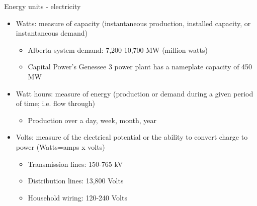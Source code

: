\documentclass{beamer}
\renewcommand{\(}{\begin{columns}}
\renewcommand{\)}{\end{columns}}
\newcommand{\<}[1]{\begin{column}{#1}}
\renewcommand{\>}{\end{column}}
\begin{document}
\begin{frame}{Energy units - electricity}
\begin{itemize}
\setlength\itemsep{.75em}
\item Watts: measure of capacity (instantaneous production, installed capacity, or instantaneous demand)
\begin{itemize}
\setlength\itemsep{.5em}
\item Alberta system demand: 7,200-10,700 MW (million watts)
\item Capital Power's Genessee 3 power plant has a nameplate capacity of 450 MW
\end{itemize}
\item Watt hours: measure of energy (production or demand during a given period of time; i.e. flow through)
\begin{itemize}
\setlength\itemsep{.5em}
\item Production over a day, week, month, year
\end{itemize}
\item Volts: measure of the electrical potential or the ability to convert charge to power (Watts=amps x volts)
\begin{itemize}
\setlength\itemsep{.5em}
\item Transmission lines: 150-765 kV
\item Distribution lines: 13,800 Volts
\item Household wiring: 120-240 Volts
\end{itemize}
\end{itemize}
\vfill \end{frame}
\end{document}
